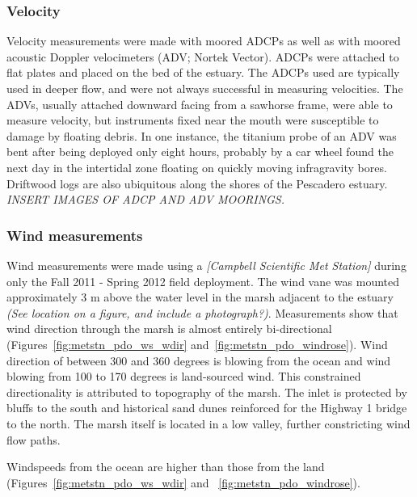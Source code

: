 \subsubsection{Velocity} \label{sssec:velmeas}
Velocity measurements were made with moored ADCPs as well as with moored acoustic Doppler velocimeters (ADV; Nortek Vector). ADCPs were attached to flat plates and placed on the bed of the estuary. The ADCPs used are typically used in deeper flow, and were not always successful in measuring velocities. The ADVs, usually attached downward facing from a sawhorse frame, were able to measure velocity, but instruments fixed near the mouth were susceptible to damage by floating debris. In one instance, the titanium probe of an ADV was bent after being deployed only eight hours, probably by a car wheel found the next day in the intertidal zone floating on quickly moving infragravity bores. Driftwood logs are also ubiquitous along the shores of the Pescadero estuary.  \emph{INSERT IMAGES OF ADCP AND ADV MOORINGS.}


\subsubsection{Wind measurements} \label{sssec:windmeas}
Wind measurements were made using a \emph{[Campbell Scientific Met Station]} during only the Fall 2011 - Spring 2012 field deployment. The wind vane was mounted approximately 3 m above the water level in the marsh adjacent to the estuary \emph{(See location on a figure, and include a photograph?)}.  Measurements show that wind direction through the marsh is almost entirely bi-directional (Figures~\ref{fig:metstn_pdo_ws_wdir} and~\ref{fig:metstn_pdo_windrose}). Wind direction of between 300 and 360 degrees is blowing from the ocean and wind blowing from 100 to 170 degrees is land-sourced wind. This constrained directionality is attributed to topography of the marsh.  The inlet is protected by bluffs to the south and historical sand dunes reinforced for the Highway 1 bridge to the north. The marsh itself is located in a low valley, further constricting wind flow paths. 

Windspeeds from the ocean are higher than those from the land (Figures~\ref{fig:metstn_pdo_ws_wdir} and~
\ref{fig:metstn_pdo_windrose}). 


% 
% 
